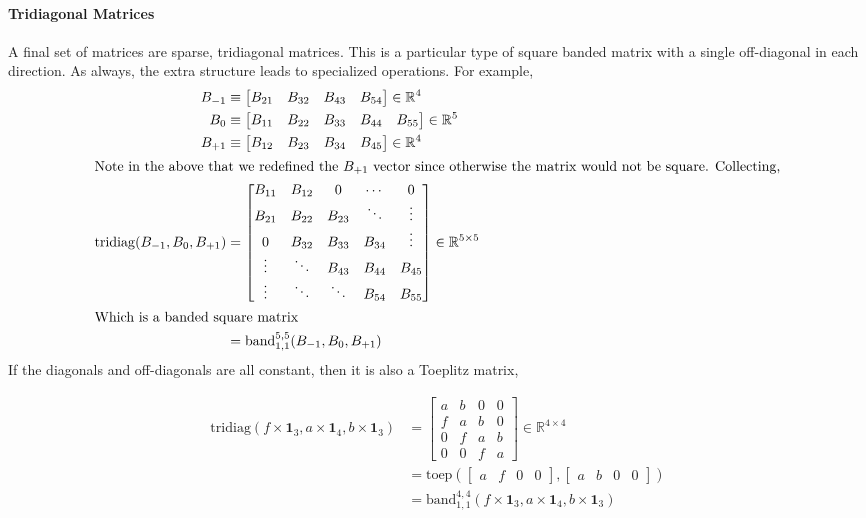 \documentclass[11pt]{article}
\newcommand{\R}{\ensuremath{\mathbb{R}}}
\newcommand{\band}{\ensuremath{\mathrm{band}}}
\newcommand{\toep}{\ensuremath{\mathrm{toep}}}
\newcommand{\tridiag}{\ensuremath{\mathrm{tridiag}}}
\theoremstyle{definition}
\begin{document}
\paragraph{Tridiagonal Matrices}
A final set of matrices are sparse, tridiagonal matrices.  This is a particular type of square banded matrix with a single off-diagonal in each direction.  As always, the extra structure leads to specialized operations.  For example,
\begin{align}
B_{-1} &\equiv \begin{bmatrix} B_{21} & B_{32} & B_{43} & B_{54} \end{bmatrix}\in\R^4\\
B_{0} &\equiv \begin{bmatrix} B_{11} & B_{22} & B_{33} & B_{44} & B_{55} \end{bmatrix}\in\R^5\\
B_{+1} &\equiv \begin{bmatrix} B_{12} & B_{23} & B_{34} & B_{45} \end{bmatrix}\in\R^4\\
\intertext{Note in the above that we redefined the $B_{+1}$ vector since otherwise the matrix would not be square.  Collecting,}
\tridiag(B_{-1}, B_0, B_{+1})&=
\begin{bmatrix}
 B_{11} & B_{12} & 0      & \cdots & 0 \\
 B_{21} & B_{22} & B_{23} & \ddots & \vdots \\
  0     & B_{32} & B_{33} & B_{34} & \vdots \\
 \vdots & \ddots & B_{43} & B_{44} & B_{45}\\
 \vdots & \ddots & \ddots & B_{54} & B_{55}
\end{bmatrix}\in \R^{5\times 5}\\
\intertext{Which is a banded square matrix}
&= \band_{1,1}^{5,5}(B_{-1}, B_{0}, B_{+1})
\end{align}
  If the diagonals and off-diagonals are all constant, then it is also a Toeplitz matrix,

\begin{align}
\tridiag\left(f\times \mathbf{1}_3, a\times \mathbf{1}_4, b\times \mathbf{1}_3\right) &= \begin{bmatrix}
	a & b & 0 & 0 \\
	f & a & b & 0 \\
	0 & f & a & b \\
	0 & 0 & f & a
	\end{bmatrix} \in \R^{4 \times 4}\\
	&= \toep(\begin{bmatrix}a & f & 0 & 0 \end{bmatrix},\begin{bmatrix}a & b & 0 & 0 \end{bmatrix})\\
	&=\band_{1,1}^{4,4}\left(f\times \mathbf{1}_3, a\times \mathbf{1}_4, b\times \mathbf{1}_3 \right)
\end{align}
\end{document}
